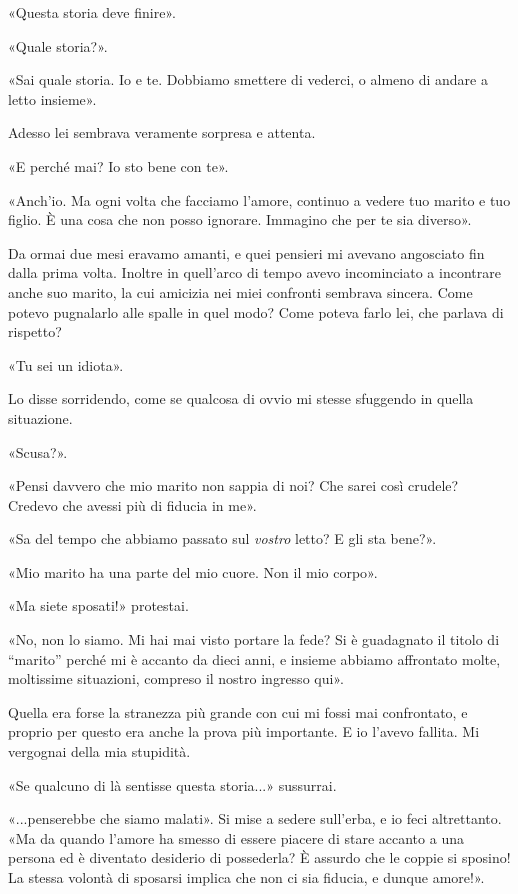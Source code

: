 \documentclass[a4paper,12pt]{book}
\begin{document}
«Questa storia deve finire».

«Quale storia?».

«Sai quale storia. Io e te. Dobbiamo smettere di vederci, o almeno di andare a
letto insieme».

Adesso lei sembrava veramente sorpresa e attenta.

«E perché mai? Io sto bene con te».

«Anch'io. Ma ogni volta che facciamo l'amore, continuo a vedere tuo marito e tuo
figlio. È una cosa che non posso ignorare. Immagino che per te sia diverso».

Da ormai due mesi eravamo amanti, e quei pensieri mi avevano angosciato fin
dalla prima volta. Inoltre in quell'arco di tempo avevo incominciato a
incontrare anche suo marito, la cui amicizia nei miei confronti sembrava
sincera. Come potevo pugnalarlo alle spalle in quel modo? Come poteva farlo lei,
che parlava di rispetto?

«Tu sei un idiota».

Lo disse sorridendo, come se qualcosa di ovvio mi stesse sfuggendo in quella
situazione.

«Scusa?».

«Pensi davvero che mio marito non sappia di noi? Che sarei così crudele? Credevo
che avessi più di fiducia in me».

«Sa del tempo che abbiamo passato sul \emph{vostro} letto? E gli sta bene?».

«Mio marito ha una parte del mio cuore. Non il mio corpo».

«Ma siete sposati!» protestai.

«No, non lo siamo. Mi hai mai visto portare la fede? Si è guadagnato il titolo
di ``marito'' perché mi è accanto da dieci anni, e insieme abbiamo affrontato
molte, moltissime situazioni, compreso il nostro ingresso qui».

Quella era forse la stranezza più grande con cui mi fossi mai confrontato, e
proprio per questo era anche la prova più importante. E io l'avevo fallita. Mi
vergognai della mia stupidità.

«Se qualcuno di là sentisse questa storia...» sussurrai.

«...penserebbe che siamo malati». Si mise a sedere sull'erba, e io feci
altrettanto. «Ma da quando l'amore ha smesso di essere piacere di stare accanto
a una persona ed è diventato desiderio di possederla? È assurdo che le coppie si
sposino! La stessa volontà di sposarsi implica che non ci sia fiducia, e dunque
amore!».
\end{document}
